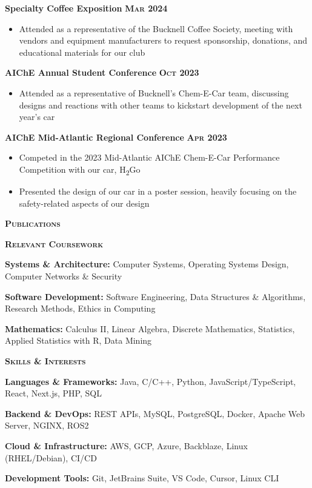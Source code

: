 \documentclass{article}
\newlength{\sectspaceabove}
\newlength{\sectspacebelow}
\newcommand{\textscbf}[1]{\textbf{\textsc{#1}}}
\newcommand{\resumesection}[1]{%
    \vspace{\sectspaceabove}%
    \begin{center}
        \textscbf{#1}
    \end{center}%
    \vspace{\sectspacebelow}%
}
\begin{document}
\textbf{Specialty Coffee Exposition}  \hfill \textscbf{Mar 2024}
\begin{itemize}[noitemsep,topsep=2pt]
    \item Attended as a representative of the Bucknell Coffee Society, meeting with vendors and equipment manufacturers to request sponsorship, donations, and educational materials for our club
\end{itemize}

\textbf{AIChE Annual Student Conference}  \hfill \textscbf{Oct 2023}
\begin{itemize}[noitemsep,topsep=2pt]
    \item Attended as a representative of Bucknell's Chem-E-Car team, discussing designs and reactions with other teams to kickstart development of the next year's car
\end{itemize}

\textbf{AIChE Mid-Atlantic Regional Conference}  \hfill \textscbf{Apr 2023}
\begin{itemize}[noitemsep,topsep=2pt]
    \item Competed in the 2023 Mid-Atlantic AIChE Chem-E-Car Performance Competition with our car, H\textsubscript{2}Go
    \item Presented the design of our car in a poster session, heavily focusing on the safety-related aspects of our design
\end{itemize}


\resumesection{Publications}

\nocite{*}



\resumesection{Relevant Coursework}

\textbf{Systems \& Architecture:} Computer Systems, Operating Systems Design, Computer Networks \& Security

\textbf{Software Development:} Software Engineering, Data Structures \& Algorithms, Research Methods, Ethics in Computing

\textbf{Mathematics:} Calculus II, Linear Algebra, Discrete Mathematics, Statistics, Applied Statistics with R, Data Mining

\resumesection{Skills \& Interests}

\textbf{Languages \& Frameworks:} Java, C/C++, Python, JavaScript/TypeScript, React, Next.js, PHP, SQL

\textbf{Backend \& DevOps:} REST APIs, MySQL, PostgreSQL, Docker, Apache Web Server, NGINX, ROS2

\textbf{Cloud \& Infrastructure:} AWS, GCP, Azure, Backblaze, Linux (RHEL/Debian), CI/CD

\textbf{Development Tools:} Git, JetBrains Suite, VS Code, Cursor, Linux CLI
\end{document}
